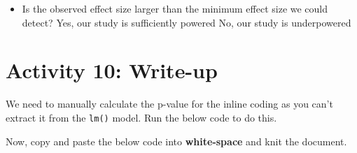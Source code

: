 \documentclass[]{book}
\newenvironment{Shaded}{\begin{snugshade}}{\end{snugshade}}
\newcommand{\DataTypeTok}[1]{\textcolor[rgb]{0.13,0.29,0.53}{#1}}
\newcommand{\DecValTok}[1]{\textcolor[rgb]{0.00,0.00,0.81}{#1}}
\newcommand{\KeywordTok}[1]{\textcolor[rgb]{0.13,0.29,0.53}{\textbf{#1}}}
\newcommand{\NormalTok}[1]{#1}
\newcommand{\OperatorTok}[1]{\textcolor[rgb]{0.81,0.36,0.00}{\textbf{#1}}}
\newcommand{\OtherTok}[1]{\textcolor[rgb]{0.56,0.35,0.01}{#1}}
\newcommand{\StringTok}[1]{\textcolor[rgb]{0.31,0.60,0.02}{#1}}
\providecommand{\tightlist}{%
  \setlength{\itemsep}{0pt}\setlength{\parskip}{0pt}}
\begin{document}
\begin{itemize}
\tightlist
\item
  Is the observed effect size larger than the minimum effect size we could detect? Yes, our study is sufficiently powered No, our study is underpowered
\end{itemize}

\hypertarget{activity-10-write-up-1}{%
\section{Activity 10: Write-up}\label{activity-10-write-up-1}}

We need to manually calculate the p-value for the inline coding as you can't extract it from the \texttt{lm()} model. Run the below code to do this.

\begin{Shaded}
\end{Shaded}

Now, copy and paste the below code into \textbf{white-space} and knit the document.
\end{document}
